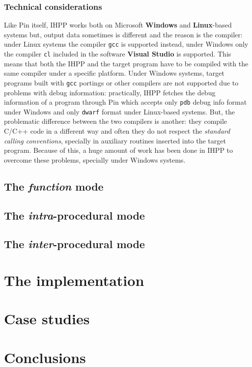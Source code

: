 \documentclass[a4paper,11pt]{report}
\begin{document}
\subsection{Technical considerations}

Like Pin itself, IHPP works both on Microsoft \textbf{Windows} and \textbf{Linux}-based systems but, output data sometimes is different and the reason is the compiler: 
under Linux systems the compiler \verb|gcc| is supported instead, under Windows only the compiler \verb|cl| included in the software \textbf{Visual Studio} is supported. 
This means that both the IHPP and the target program have to be compiled with the same compiler under a specific platform. Under Windows systems, target programs built with \verb|gcc| portings or other compilers are not supported due to problems with debug information: 
practically, IHPP fetches the debug information of a program through Pin which accepts only \verb|pdb| debug info format under Windows and only \verb|dwarf| format under Linux-based systems. But, the problematic difference between the two compilers is another: 
they compile C/C++ code in a different way and often they do not respect the \emph{standard calling conventions}, specially in auxiliary routines inserted into the target program. 
Because of this, a huge amount of work has been done in IHPP to overcome these problems, 
specially under Windows systems.

\section{The \emph{function} mode}



\section{The \emph{intra}-procedural mode}

\section{The \emph{inter}-procedural mode}

\chapter{The implementation}



\chapter{Case studies}


\chapter{Conclusions}

{}

\end{document}
